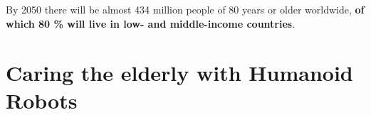 \documentclass[compress]{beamer}
\begin{document}
\subsection{}
{
\begin{frame}[plain]{}

\vspace{20mm}


        \LARGE
        By 2050 there will be almost 434 million people of 80 years or older worldwide,
        {\bf of which 80 \% will live in low- and middle-income countries}.




\end{frame}
}



\subsection{}


\subsection{}





\section{Caring the elderly with Humanoid Robots}
\end{document}
